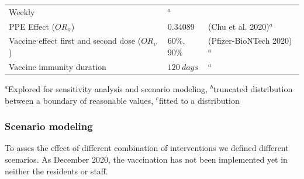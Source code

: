 \documentclass[
]{article}
\begin{document}
\begin{longtable}[]{@{}lll@{}}
\begin{minipage}[t]{0.33\columnwidth}
Weekly\strut
\end{minipage} & \begin{minipage}[t]{0.16\columnwidth}\raggedright
\(^a\)\strut
\end{minipage}\tabularnewline
\begin{minipage}[t]{0.42\columnwidth}\raggedright
PPE Effect (\(OR_\pi\))\strut
\end{minipage} & \begin{minipage}[t]{0.33\columnwidth}\raggedright
0.34089\strut
\end{minipage} & \begin{minipage}[t]{0.16\columnwidth}\raggedright
(Chu et al. 2020)\(^a\)\strut
\end{minipage}\tabularnewline
\begin{minipage}[t]{0.42\columnwidth}\raggedright
Vaccine effect first and second dose (\(OR_\upsilon\))\strut
\end{minipage} & \begin{minipage}[t]{0.33\columnwidth}\raggedright
\(60\%\),\(90\%\)\strut
\end{minipage} & \begin{minipage}[t]{0.16\columnwidth}\raggedright
(Pfizer-BioNTech 2020)\(^a\)\strut
\end{minipage}\tabularnewline
\begin{minipage}[t]{0.42\columnwidth}\raggedright
Vaccine immunity duration\strut
\end{minipage} & \begin{minipage}[t]{0.33\columnwidth}\raggedright
\(120\ days\)\strut
\end{minipage} & \begin{minipage}[t]{0.16\columnwidth}\raggedright
\(^a\)\strut
\end{minipage}\tabularnewline
\bottomrule
\end{longtable}

\(^a\)Explored for sensitivity analysis and scenario modeling,
\(^b\)truncated distribution between a boundary of reasonable values,
\(^c\)fitted to a distribution

\hypertarget{scenario-modeling}{%
\subsubsection{Scenario modeling}\label{scenario-modeling}}

To asses the effect of different combination of interventions we defined
different scenarios. As December 2020, the vaccination has not been
implemented yet in neither the residents or staff.
\end{document}
